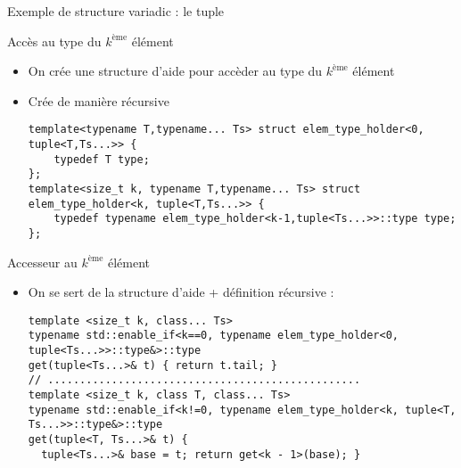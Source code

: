 \documentclass[handout,10pt]{beamer}
\begin{document}
\begin{frame}[fragile]{Exemple de structure variadic : le tuple}
\tiny
\begin{exampleblock}{Accès au type du $k^{\mbox{ème}}$ élément}
\begin{itemize}
\item On crée une structure d'aide pour accèder au type du $k^{\mbox{ème}}$ élément
\item Crée de manière récursive
\begin{lstlisting}
template<typename T,typename... Ts> struct elem_type_holder<0, tuple<T,Ts...>> {
    typedef T type;
};
template<size_t k, typename T,typename... Ts> struct elem_type_holder<k, tuple<T,Ts...>> {
    typedef typename elem_type_holder<k-1,tuple<Ts...>>::type type;
};
\end{lstlisting}
\end{itemize}
\end{exampleblock}

\begin{block}{Accesseur au $k^{\mbox{ème}}$ élément}
\begin{itemize}
\item On se sert de la structure d'aide + définition récursive :
\begin{lstlisting}
template <size_t k, class... Ts>
typename std::enable_if<k==0, typename elem_type_holder<0, tuple<Ts...>>::type&>::type
get(tuple<Ts...>& t) { return t.tail; }
// .................................................
template <size_t k, class T, class... Ts>
typename std::enable_if<k!=0, typename elem_type_holder<k, tuple<T, Ts...>>::type&>::type
get(tuple<T, Ts...>& t) {
  tuple<Ts...>& base = t; return get<k - 1>(base); }
\end{lstlisting}
\end{itemize}
\end{block}
\end{frame}
\end{document}
